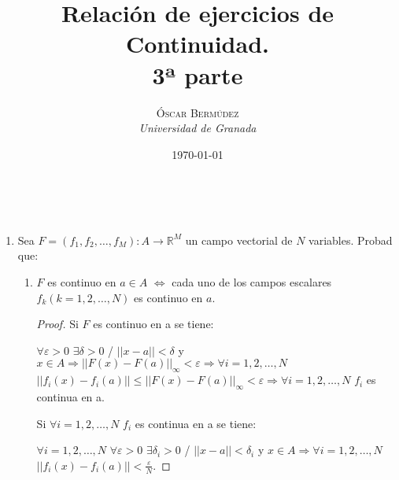 \documentclass[a4paper, 11pt]{article} %
\title{\textbf{Relación de ejercicios de Continuidad.}\\ %
3ª parte} %
\author{\textsc{Óscar Bermúdez} %
\\{\textit{Universidad de Granada}}} %
\date{\today} %
\makeatletter
\renewcommand{\maketitle}{ %
\begin{flushright} %
{\LARGE\@title} %

\vspace{50pt} %

{\large\@author} %
\\\@date %

\vspace{40pt} %
\end{flushright}
}
\makeatother
\begin{document}
\maketitle %

\begin{enumerate}
	\item Sea $F = (f_1, f_2, \dots, f_M): A \rightarrow \mathbb{R}^M$ un campo vectorial de $N$ variables. Probad que:
	\begin{enumerate}[label=\alph*)]
		\item $F$ es continuo en $a \in A$ $\Leftrightarrow$ cada uno de los campos escalares $f_k(k = 1, 2 ,\dots,N)$ es continuo en $a$.
		\begin{proof}
			\fbox{$\Rightarrow$} Si $F$ es continuo en a se tiene:
			
			$\forall \varepsilon > 0$ $\exists \delta > 0$ / $||x-a|| < \delta$ y $x \in A \Rightarrow ||F(x)-F(a)||_\infty < \varepsilon \Rightarrow \forall i = 1,2,\dots,N$ $||f_i(x)-f_i(a)|| \le ||F(x)-F(a)||_\infty < \varepsilon \Rightarrow \forall i = 1,2,\dots,N$ $f_i$ es continua en a.
			
			\fbox{$\Leftarrow$} Si $\forall i = 1,2,\dots, N$ $f_i$ es continua en a se tiene:
			
			$\forall i = 1,2,\dots,N$ $\forall \varepsilon > 0$ $\exists \delta_i > 0$ / $||x-a|| < \delta_i$ y $x \in A \Rightarrow \forall i = 1,2,\dots,N$ $||f_i(x)-f_i(a)|| < \displaystyle{\frac{\varepsilon}{N}}$.
			

\end{proof}
\end{enumerate}
\end{enumerate}
\end{document}
